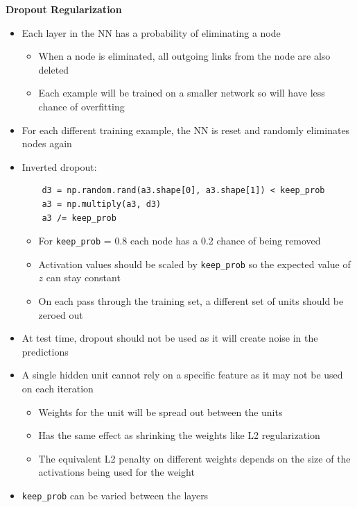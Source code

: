 \documentclass[12pt, letterpaper]{article}
\begin{document}
    \vspace{5mm}
    \textbf{Dropout Regularization}
    \begin{itemize}
        \item Each layer in the NN has a probability of eliminating a node
        \begin{itemize}
            \item When a node is eliminated, all outgoing links from the node are also deleted
            \item Each example will be trained on a smaller network so will have less chance of overfitting 
        \end{itemize}
        \item For each different training example, the NN is reset and randomly eliminates nodes again
        \item Inverted dropout:
        \begin{verbatim}
    d3 = np.random.rand(a3.shape[0], a3.shape[1]) < keep_prob
    a3 = np.multiply(a3, d3)
    a3 /= keep_prob
        \end{verbatim}
        \begin{itemize}
            \item For \texttt{keep\_prob} = 0.8  each node has a 0.2 chance of being removed
            \item Activation values should be scaled by \texttt{keep\_prob} so the expected value of $z$ can stay constant
            \item On each pass through the training set, a different set of units should be zeroed out   
        \end{itemize}
        \item At test time, dropout should not be used as it will create noise in the predictions
        \item A single hidden unit cannot rely on a specific feature as it may not be used on each iteration
        \begin{itemize}
            \item Weights for the unit will be spread out between the units
            \item Has the same effect as shrinking the weights like L2 regularization
            \item The equivalent L2 penalty on different weights depends on the size of the activations being used for the weight
        \end{itemize}
        \item \texttt{keep\_prob} can be varied between the layers

\end{itemize}
\end{document}

